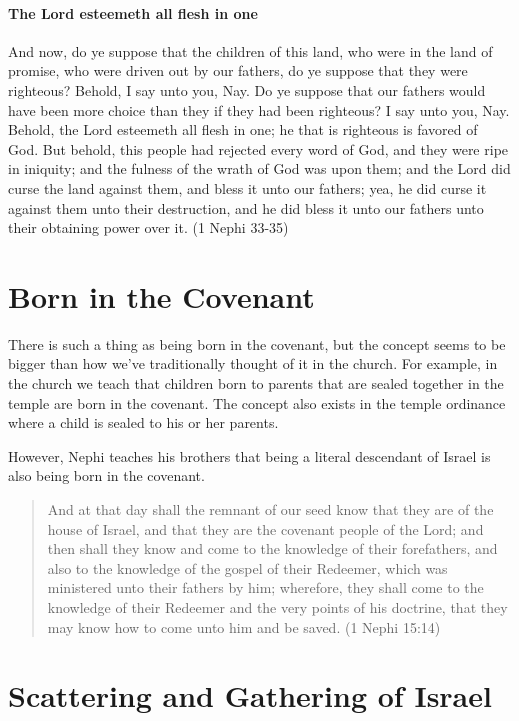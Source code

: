 \paragraph{The Lord esteemeth all flesh in one}
And now, do ye suppose that the children of this land, who were in the land of promise, who were driven out by our fathers, do ye suppose that they were righteous? Behold, I say unto you, Nay. Do ye suppose that our fathers would have been more choice than they if they had been righteous? I say unto you, Nay. Behold, the Lord esteemeth all flesh in one; he that is righteous is favored of God. But behold, this people had rejected every word of God, and they were ripe in iniquity; and the fulness of the wrath of God was upon them; and the Lord did curse the land against them, and bless it unto our fathers; yea, he did curse it against them unto their destruction, and he did bless it unto our fathers unto their obtaining power over it. (1 Nephi 33-35)

\section{Born in the Covenant}

There is such a thing as being born in the covenant, but the concept seems to be bigger than how we've traditionally thought of it in the church. For example, in the church we teach that children born to parents that are sealed together in the temple are born in the covenant. The concept also exists in the temple ordinance where a child is sealed to his or her parents.

However, Nephi teaches his brothers that being a literal descendant of Israel is also being born in the covenant. 

\begin{quotation}
And at that day shall the remnant of our seed know that they are of the house of Israel, and that they are the covenant people of the Lord; and then shall they know and come to the knowledge of their forefathers, and also to the knowledge of the gospel of their Redeemer, which was ministered unto their fathers by him; wherefore, they shall come to the knowledge of their Redeemer and the very points of his doctrine, that they may know how to come unto him and be saved. (1 Nephi 15:14)
\end{quotation}

\section{Scattering and Gathering of Israel}

